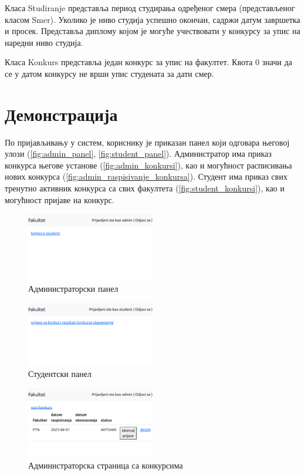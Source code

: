 \documentclass[a4paper]{article}
\begin{document}
Класа Studiranje представља период студирања одређеног смера (представљеног класом Smer). Уколико је ниво студија
успешно окончан, садржи датум завршетка и просек. Представља диплому којом је могуће учествовати у конкурсу за упис
на наредни ниво студија.

Класа Konkurs представља један конкурс за упис на факултет. Квота 0 значи да се у датом конкурсу не врши упис студената за дати смер.

\section*{Демонстрација}

По пријављивању у систем, кориснику је приказан панел који одговара његовој улози (\autoref{fig:admin_panel}, \autoref{fig:student_panel}). 
Администратор има приказ конкурса његове установе (\autoref{fig:admin_konkursi}), као и могућност
расписивања нових конкурса (\autoref{fig:admin_raspisivanje_konkursa}).
Студент има приказ свих тренутно активник конкурса са свих факултета (\autoref{fig:student_konkursi}), као и могућност пријаве на конкурс.

\begin{figure}[H]
    \centering
    \includegraphics[width=0.5\textwidth,keepaspectratio]{images/admin_panel.png}
    \caption{Администраторски панел}
    \label{fig:admin_panel}
\end{figure}

\begin{figure}[H]
    \centering
    \includegraphics[width=0.5\textwidth,keepaspectratio]{images/student_panel.png}
    \caption{Студентски панел}
    \label{fig:student_panel}
\end{figure}

\begin{figure}[H]
    \centering
    \includegraphics[width=0.5\textwidth,keepaspectratio]{images/admin_konkursi.png}
    \caption{Администраторска страница са конкурсима}
    \label{fig:admin_konkursi}
\end{figure}
\end{document}
